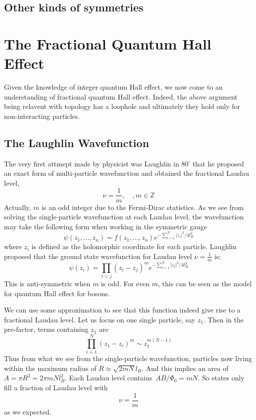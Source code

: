 \documentclass[12pt,a4paper]{article}
\numberwithin{equation}{section}
\begin{document}
\subsection{Other kinds of symmetries}



\section{The Fractional Quantum Hall Effect}

Given the knowledge of integer quantum Hall effect, we now come to an understanding of fractional quantum Hall effect.
Indeed, the above argument being relavent with topology has a loophole and ultimately they hold only for non-interacting particles.

\subsection{The Laughlin Wavefunction}
The very first attmept made by physicist was Laughlin in 80' that he proposed an exact form of multi-particle wavefunction and obtained the fractional
Laudau level,
\begin{equation}
    \nu = \frac{1}{m}, \quad , m\in\mathbb{Z}
\end{equation}
Actually, $m$ is an odd integer due to the Fermi-Dirac statistics. As we see from solving the single-particle wavefunction at each Laudau level, the wavefunction may take the following form when working in the symmetric gauge
\begin{equation}
    \psi(z_1,\ldots,z_n)= f(z_1,\ldots,z_n)e^{-\sum_{i=1}^N |z_i|^2/4l_B^2}
\end{equation}
where $z_i$ is defined as the holomorphic coordinate for each particle. Laughlin proposed that the ground state wavefunction for Laudau level $\nu=\frac{1}{m}$ is:
\begin{equation}
    \psi(z_i) = \prod_{i<j}(z_i-z_j)^m e^{-\sum_{i=1}^N |z_i|^2/4l_B^2}
\end{equation}
This is anti-symmetric when $m$ is odd. For even $m$, this can be seen as the model for quantum Hall effect for bosons.

We can use some approximation to see that this function indeed give rise to a fractional Laudau level. Let us focus on one single particle, say $z_1$.
Then in the pre-factor, terms containing $z_1$ are
\begin{equation}
    \prod_{i=1}^N(z_1-z_i)^m \sim z_1^{m(N-1)}
\end{equation}
Thus from what we see from the single-particle wavefunction, particles now living within the maximum radius of $R\approx\sqrt{2mN}l_B$. And this implies an area of $A=\pi R^2 = 2\pi mNl_B^2$.
Each Laudau level contains~$ AB/\Phi_0=mN$. So states only fill a fraction of Laudau level with
\begin{equation}
    \nu = \frac{1}{m}
\end{equation}
as we expected.
\end{document}
